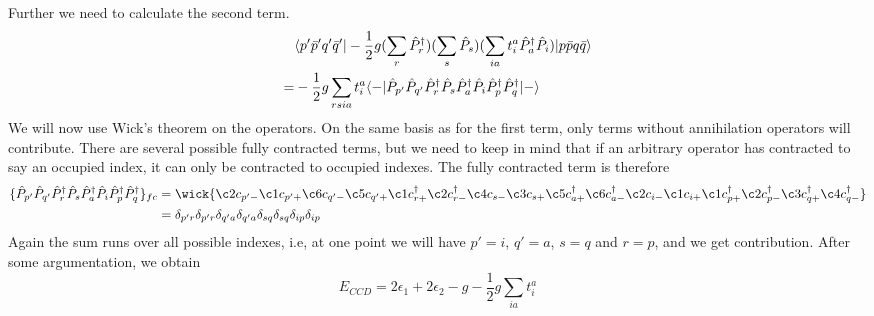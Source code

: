 \documentclass[norsk,a4paper,12pt]{article}
\begin{document}
Further we need to calculate the second term. 
\begin{align}
&\langle p'\bar{p}'q'\bar{q}'|-\frac{1}{2}g(\sum_{r}\hat{P}_r^{\dagger})(\sum_s\hat{P}_s)(\sum_{ia}t_i^a\hat{P}_a^{\dagger}\hat{P}_i)|p\bar{p}q\bar{q}\rangle\notag\\
=&-\frac{1}{2}g\sum_{rsia}t_i^a\langle-|\hat{P}_{p'}\hat{P}_{q'}\hat{P}_r^{\dagger}\hat{P}_s\hat{P}_a^{\dagger}\hat{P}_i\hat{P}_p^{\dagger}\hat{P}_q^{\dagger}|-\rangle
\end{align}
We will now use Wick's theorem on the operators. On the same basis as for the first term, only terms without annihilation operators will contribute. There are several possible fully contracted terms, but we need to keep in mind that if an arbitrary operator has contracted to say an occupied index, it can only be contracted to occupied indexes. The fully contracted term is therefore 
\begin{align*}
\{\hat{P}_{p'}\hat{P}_{q'}\hat{P}_r^{\dagger}\hat{P}_s\hat{P}_a^{\dagger}\hat{P}_i\hat{P}_p^{\dagger}\hat{P}_q^{\dagger}\}_{fc}
&=\wick{\c2 c_{p'-}\c1 c_{p'+}\c6 c_{q'-}\c5 c_{q'+}\c1 c_{r+}^{\dagger}\c2 c_{r-}^{\dagger}\c4 c_{s-}\c3 c_{s+}\c5 c_{a+}^{\dagger}\c6 c_{a-}^{\dagger}\c2 c_{i-}\c1 c_{i+}\c1 c_{p+}^{\dagger}\c2 c_{p-}^{\dagger}\c3 c_{q+}^{\dagger}\c4 c_{q-}^{\dagger}}\\
&=\delta_{p'r}\delta_{p'r}\delta_{q'a}\delta_{q'a}\delta_{sq}\delta_{sq}\delta_{ip}\delta_{ip}
\end{align*}
Again the sum runs over all possible indexes, i.e, at one point we will have $p'=i$, $q'=a$, $s=q$ and $r=p$, and we get contribution. After some argumentation, we obtain
\begin{equation}
E_{CCD}=2\epsilon_1+2\epsilon_2-g-\frac{1}{2}g\sum_{ia}t_i^a
\end{equation}
\end{document}
